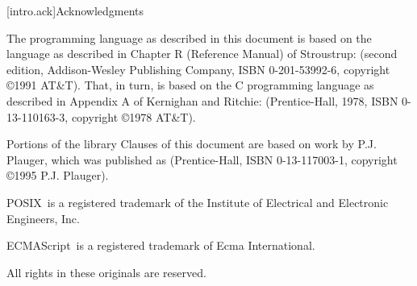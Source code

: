 [intro.ack]{Acknowledgments}

\pnum
The \Cpp{}  programming language as described in this document
is based on the language as described in Chapter R (Reference
Manual) of Stroustrup:  (second
edition, Addison-Wesley Publishing Company, ISBN 0-201-53992-6,
copyright \copyright 1991 AT\&T). That, in turn, is based on the C
programming language as described in Appendix A of Kernighan and
Ritchie:  (Prentice-Hall, 1978, ISBN
0-13-110163-3, copyright \copyright 1978 AT\&T).

\pnum
Portions of the library Clauses of this document are based
on work by P.J. Plauger, which was published as  (Prentice-Hall, ISBN 0-13-117003-1, copyright
\copyright 1995 P.J. Plauger).

\pnum
POSIX\textregistered\ is a registered trademark of the Institute of Electrical and
Electronic Engineers, Inc.

\pnum
ECMAScript\textregistered\ is a registered trademark of Ecma International.

\pnum
All rights in these originals are reserved.
